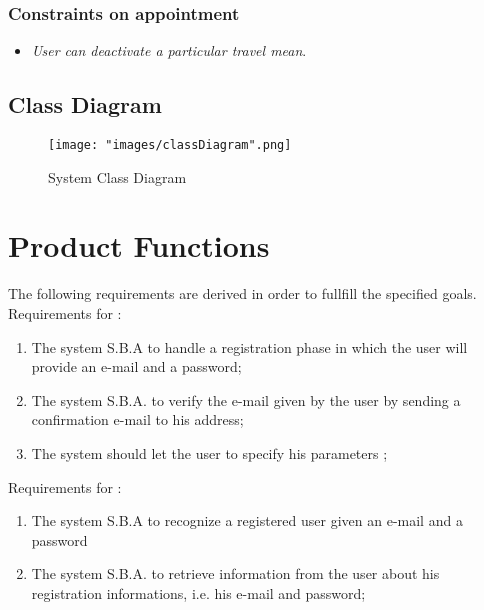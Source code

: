 \subsubsection{Constraints on appointment} \label{subsubsect:constronappoint}
\begin{itemize}
\item \textit{User can deactivate a particular travel mean}.
\end{itemize}

\subsection{Class Diagram}
\begin{figure}[H]
\begin{center}
\texttt{[image: "images/classDiagram".png]}
\caption{System Class Diagram}
\end{center}
\end{figure}

\section{Product Functions}

The following requirements are derived in order to fullfill the specified goals.\\

Requirements for :
\begin{enumerate}%
\renewcommand\labelenumi{\textbf{R\theenumi}}
\item The system S.B.A to handle a registration phase in which the user will provide an e-mail and a password; \label{req:R1}
\item The system S.B.A. to verify the e-mail given by the user by sending a confirmation e-mail to his address; \label{req:R2}
\item  The system should let the user to specify his parameters ;
\end{enumerate} \label{req:R3}

Requirements for :
\begin{enumerate}[resume]
\renewcommand\labelenumi{\textbf{R\theenumi}}
\item The system S.B.A to recognize a registered user given an e-mail and a password \label{req:R4}
\item The system S.B.A. to retrieve information from the user about his registration informations, i.e. his e-mail and password; \label{req:R5}
\end{enumerate}

